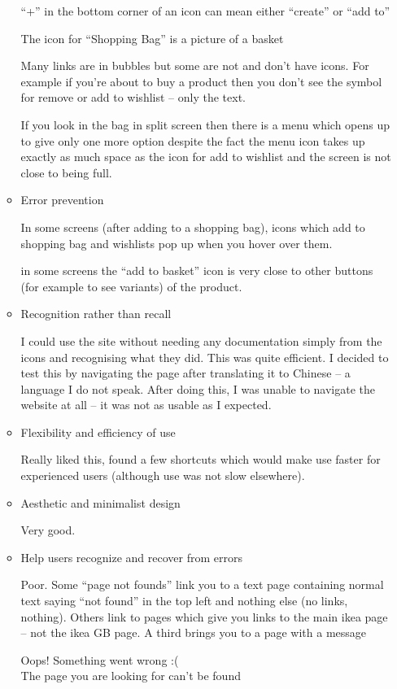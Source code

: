 \documentclass[10pt,\jkfside,a4paper]{article}
\begin{document}
\begin{enumerate}
\begin{itemize}
``+'' in the bottom corner of an icon can mean either ``create'' or ``add to''

The icon for ``Shopping Bag'' is a picture of a basket

Many links are in bubbles but some are not and don't have icons. For example if you're about to buy a
product then you don't see the symbol for remove or add to wishlist -- only the text.

If you look in the bag in split screen then there is a menu which opens up to give only one more
option despite the fact the menu icon takes up exactly as much space as the icon for add to wishlist and
the screen is not close to being full.

\item Error prevention

In some screens (after adding to a shopping bag), icons which add to shopping bag and
wishlists pop up when you hover over them.

in some screens the ``add to basket'' icon is very close to other buttons (for example to see variants) of the product.

\item Recognition rather than recall

I could use the site without needing any documentation simply from the icons and
recognising what they did. This was quite efficient. I decided to test this by
navigating the page after translating it to Chinese -- a language I do not speak.
After doing this, I was unable to navigate the website at all -- it was not as
usable as I expected.

\item Flexibility and efficiency of use

Really liked this, found a few shortcuts which would make use faster for experienced
users (although use was not slow elsewhere).

\item Aesthetic and minimalist design

Very good.

\item Help users recognize and recover from errors

Poor. Some ``page not founds'' link you to a text page containing normal text
saying ``not found'' in the top left and nothing else (no links, nothing). Others link to pages which give you links
to the main ikea page -- not the ikea GB page. A third brings you to a page with a
message

Oops! Something went wrong :(\\
The page you are looking for can't be found


\end{itemize}
\end{enumerate}
\end{document}
